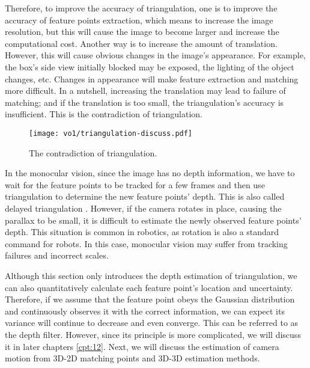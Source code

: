 Therefore, to improve the accuracy of triangulation, one is to improve the accuracy of feature points extraction, which means to increase the image resolution, but this will cause the image to become larger and increase the computational cost. Another way is to increase the amount of translation. However, this will cause obvious changes in the image's appearance. For example, the box's side view initially blocked may be exposed, the lighting of the object changes, etc. Changes in appearance will make feature extraction and matching more difficult. In a nutshell, increasing the translation may lead to failure of matching; and if the translation is too small, the triangulation's accuracy is insufficient. This is the contradiction of triangulation. 

\begin{figure}[!ht]
	\centering
	\texttt{[image: vo1/triangulation-discuss.pdf]}
	\caption{The contradiction of triangulation.}
	\label{fig:triangulation-discuss}
\end{figure}

In the monocular vision, since the image has no depth information, we have to wait for the feature points to be tracked for a few frames and then use triangulation to determine the new feature points' depth. This is also called delayed triangulation  {\cite{Davison2003}}. However, if the camera rotates in place, causing the parallax to be small, it is difficult to estimate the newly observed feature points' depth. This situation is common in robotics, as rotation is also a standard command for robots. In this case, monocular vision may suffer from tracking failures and incorrect scales.

Although this section only introduces the depth estimation of triangulation, we can also quantitatively calculate each feature point's location and uncertainty. Therefore, if we assume that the feature point obeys the Gaussian distribution and continuously observes it with the correct information, we can expect its variance will continue to decrease and even converge. This can be referred to as the depth filter. However, since its principle is more complicated, we will discuss it in later chapters \ref{cpt:12}. Next, we will discuss the estimation of camera motion from 3D-2D matching points and 3D-3D estimation methods.

